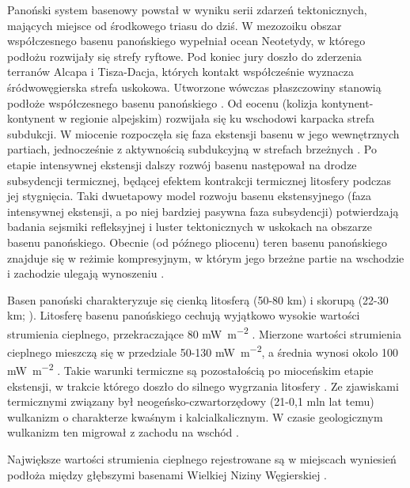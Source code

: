 \documentclass[11.5pt,twoside]{report}
\begin{document}
Panoński system basenowy powstał w wyniku serii zdarzeń tektonicznych, mających miejsce od środkowego triasu do dziś. W mezozoiku obszar współczesnego basenu panońskiego wypełniał ocean Neotetydy, w którego podłożu rozwijały się strefy ryftowe. Pod koniec jury doszło do zderzenia terranów Alcapa i Tisza-Dacja, których kontakt współcześnie wyznacza śródwowęgierska strefa uskokowa. Utworzone wówczas płaszczowiny stanowią podłoże współczesnego basenu panońskiego \parencite{Csontos.2004}. Od eocenu (kolizja kontynent-kontynent w regionie alpejskim) rozwijała się ku wschodowi karpacka strefa subdukcji. W miocenie rozpoczęła się faza ekstensji basenu w jego wewnętrznych partiach, jednocześnie z aktywnością subdukcyjną w strefach brzeżnych \parencite{Csontos.2004}. Po etapie intensywnej ekstensji dalszy rozwój basenu następował na drodze subsydencji termicznej, będącej efektem kontrakcji termicznej litosfery podczas jej stygnięcia. Taki dwuetapowy model rozwoju basenu ekstensyjnego (faza intensywnej ekstensji, a po niej bardziej pasywna faza subsydencji) potwierdzają badania sejsmiki refleksyjnej i luster tektonicznych w uskokach na obszarze basenu panońskiego. Obecnie (od pó\'{z}nego pliocenu) teren basenu panońskiego znajduje się w reżimie kompresyjnym, w którym jego brzeżne partie na wschodzie i zachodzie ulegają wynoszeniu \parencite{Horvath.1996}. 


Basen panoński charakteryzuje się cienką litosferą (50-80 km) i skorupą (22-30 km; \cite{Harangi.2007}). Litosferę basenu panońskiego cechują wyjątkowo wysokie wartości strumienia cieplnego, przekraczające 80 \si{\milli\watt\per\meter\squared} \parencite{Boldizsar.1964}. Mierzone wartości strumienia cieplnego mieszczą się w przedziale 50-130 \si{\milli\watt\per\meter\squared}, a średnia wynosi okolo 100 \si{\milli\watt\per\meter\squared} \parencite{Horvath.2015}. Takie warunki termiczne są pozostałością po mioceńskim etapie ekstensji, w trakcie którego doszło do silnego wygrzania litosfery \parencite{Lenkey.2017}. Ze zjawiskami termicznymi związany był neogeńsko-czwartorzędowy (21-0,1 mln lat temu) wulkanizm o charakterze kwaśnym i kalcialkalicznym. W czasie geologicznym wulkanizm ten migrował z zachodu na wschód \parencite{Lexa.2010}. 

Największe wartości strumienia cieplnego rejestrowane są w miejscach wyniesień podłoża między głębszymi basenami Wielkiej Niziny Węgierskiej \parencite{Bekesi.2017}. 
\end{document}
